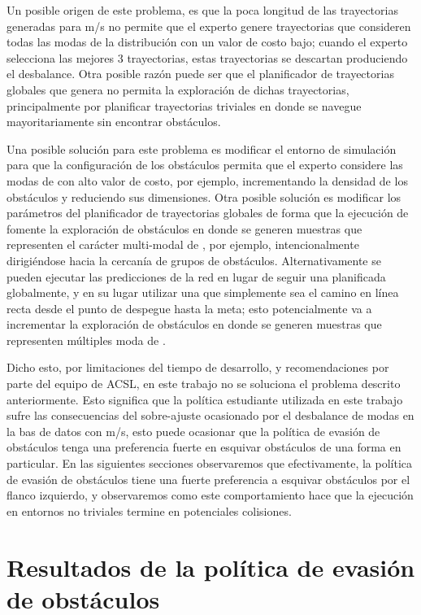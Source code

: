 Un posible origen de este problema, es que la poca longitud de las trayectorias generadas para  m/s no permite que el experto genere trayectorias que consideren todas las modas de la distribución  con un valor de costo bajo; cuando el experto selecciona las mejores 3 trayectorias, estas trayectorias se descartan produciendo el desbalance. Otra posible razón puede ser que el planificador de trayectorias globales que genera  no permita la exploración de dichas trayectorias, principalmente por planificar trayectorias triviales en donde se navegue mayoritariamente sin encontrar obstáculos. 

Una posible solución para este problema es modificar el entorno de simulación para que la configuración de los obstáculos permita que el experto considere las modas de  con alto valor de costo, por ejemplo, incrementando la densidad de los obstáculos y reduciendo sus dimensiones. Otra posible solución es modificar los parámetros del planificador de trayectorias globales de forma que la ejecución de  fomente la exploración de obstáculos en donde se generen muestras que representen el carácter multi-modal de , por ejemplo, intencionalmente dirigiéndose hacia la cercanía de grupos de obstáculos. Alternativamente se pueden ejecutar las predicciones de la red en lugar de seguir una  planificada globalmente, y en su lugar utilizar una  que simplemente sea el camino en línea recta desde el punto de despegue hasta la meta; esto potencialmente va a incrementar la exploración de obstáculos en donde se generen muestras que representen múltiples moda de .

Dicho esto, por limitaciones del tiempo de desarrollo, y recomendaciones por parte del equipo de ACSL, en este trabajo no se soluciona el problema descrito anteriormente. Esto significa que la política estudiante utilizada en este trabajo sufre las consecuencias del sobre-ajuste ocasionado por el desbalance de modas en la bas de datos con  m/s, esto puede ocasionar que la política de evasión de obstáculos tenga una preferencia fuerte en esquivar obstáculos de una forma en particular. En las siguientes secciones observaremos que efectivamente, la política de evasión de obstáculos tiene una fuerte preferencia a esquivar obstáculos por el flanco izquierdo, y observaremos como este comportamiento hace que la ejecución en entornos no triviales termine en potenciales colisiones.

\section{Resultados de la política de evasión de obstáculos}

